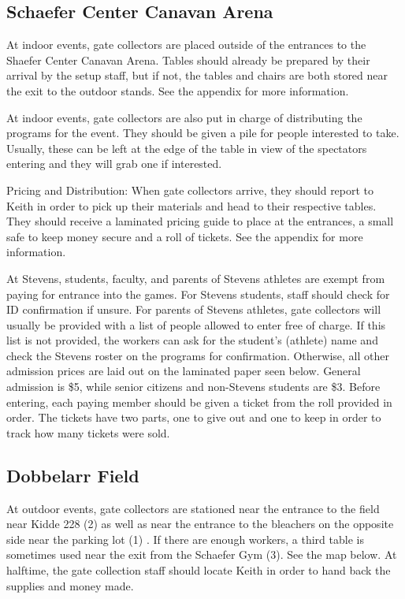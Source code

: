 \documentclass{article}
\begin{document}
 \subsection{Schaefer Center Canavan Arena}
At indoor events, gate collectors are placed outside of the entrances to the Shaefer Center Canavan Arena. Tables should already be prepared by their arrival by the setup staff, but if not, the tables and chairs are both stored near the exit to the outdoor stands. See the appendix for more information.


At indoor events, gate collectors are also put in charge of distributing the programs for the event. They should be given a pile for people interested to take. Usually, these can be left at the edge of the table in view of the spectators entering and they will grab one if interested. 


Pricing and Distribution:
When gate collectors arrive, they should report to Keith in order to pick up their materials and head to their respective tables. They should receive a laminated pricing guide to place at the entrances, a small safe to keep money secure and a roll of tickets. See the appendix for more information. 


At Stevens, students, faculty, and parents of Stevens athletes are exempt from paying for entrance into the games. For Stevens students, staff should check for ID confirmation if unsure. For parents of Stevens athletes, gate collectors will usually be provided with a list of people allowed to enter free of charge. If this list is not provided, the workers can ask for the student’s (athlete) name and check the Stevens roster on the programs for confirmation. Otherwise, all other admission prices are laid out on the laminated paper seen below. General admission is \$5, while senior citizens and non-Stevens students are \$3. Before entering, each paying member should be given a ticket from the roll provided in order. The tickets have two parts, one to give out and one to keep in order to track how many tickets were sold. 

\subsection{Dobbelarr Field}
At outdoor events, gate collectors are stationed near the entrance to the field near Kidde 228 (2) as well as near the entrance to the bleachers on the opposite side near the parking lot (1) . If there are enough workers, a third table is sometimes used near the exit from the Schaefer Gym (3). See the map below. At halftime, the gate collection staff should locate Keith in order to hand back the supplies and money made. 
\end{document}
